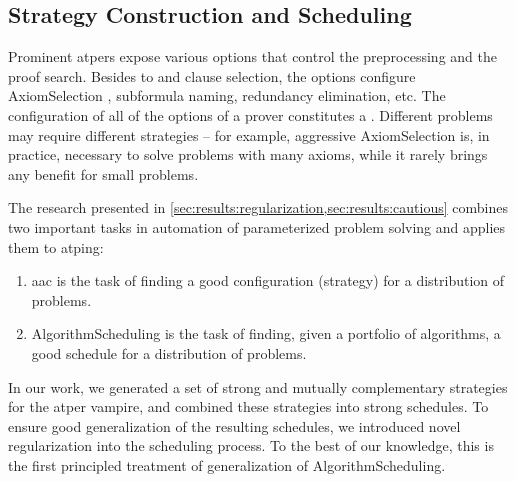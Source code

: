 \subsection{Strategy Construction and Scheduling}

Prominent \glspl{atper} expose various options that control the preprocessing and the proof search.
Besides \gls{to} and clause selection,
the options configure \gls{AxiomSelection} \cite{DBLP:conf/cade/HoderV11}, subformula naming, redundancy elimination, etc.
The configuration of all of the options of a prover constitutes a .
Different problems may require different strategies -- for example, aggressive \gls{AxiomSelection} is, in practice, necessary to solve problems with many axioms, while it rarely brings any benefit for small problems.

The research presented in \cref{sec:results:regularization,sec:results:cautious} combines two important tasks in automation of parameterized problem solving and applies them to \gls{atping}:
\begin{enumerate}
\item \Gls{aac} is the task of finding a good configuration (strategy) for a distribution of problems.
\item \Gls{AlgorithmScheduling} is the task of finding, given a portfolio of algorithms, a good schedule for a distribution of problems.
\end{enumerate}
In our work, we generated a set of strong and mutually complementary strategies for the \gls{atper} \gls{vampire},
and combined these strategies into strong schedules.
To ensure good generalization of the resulting schedules, we introduced novel regularization into the scheduling process.
To the best of our knowledge, this is the first principled treatment of generalization of \gls{AlgorithmScheduling}.

